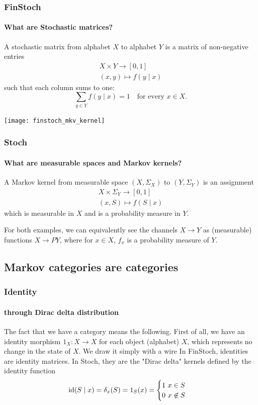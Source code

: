 \begin{frame}
    \frametitle{FinStoch}
    \framesubtitle{What are Stochastic matrices?}
    \begin{minipage}{.48\textwidth}
        A stochastic matrix from alphabet $X$ to alphabet $Y$ is a matrix of non-negative entries
        \begin{align*}
            X\times Y \to [0,1]\\
            (x, y) \mapsto f(y\mid x)
        \end{align*}
        such that each column sums to one:
        \[
            \sum_{y\in Y} f(y\mid x) = 1 \quad \text{for every $x\in X$.}
        \]
    \end{minipage}
    \hfill
    \begin{minipage}{.48\textwidth}
        \texttt{[image: finstoch\_mkv\_kernel]}
    \end{minipage}
\end{frame}

\begin{frame}
    \frametitle{Stoch}
    \framesubtitle{What are measurable spaces and Markov kernels?}
    A Markov kernel from measurable space $(X, \Sigma_X)$ to $(Y, \Sigma_Y)$ is an assignment
    \begin{align*}
        X\times \Sigma_Y \to [0, 1]\\
        (x, S) \mapsto f(S\mid x)
    \end{align*}
    which is measurable in $X$ and is a probability measure in $Y$.
\end{frame}

\begin{frame}
    For both examples, we can equivalently see the channels $X\to Y$ as (measurable) functions $X\to PY$, where for $x\in X$, $f_x$ is a probability measure of $Y$.

    
\end{frame}

\subsection{Markov categories are categories}

\begin{frame}
    \frametitle{Identity}
    \framesubtitle{through Dirac delta distribution}
    The fact that we have a category means the following. First of all, we have an identity morphism $1_X: X\to X$ for each object (alphabet) $X$, which represents no change in the state of $X$. We draw it simply with a wire
    In FinStoch, identities are identity matrices. In Stoch, they are the "Dirac delta" kernels defined by the identity function
    \[
        \text{\normalfont id} (S\mid x) = \delta_x (S) = 1_S(x) = \begin{cases} 1\ x\in S\\ 0\ x\not \in S
        \end{cases}
    \]
\end{frame}

